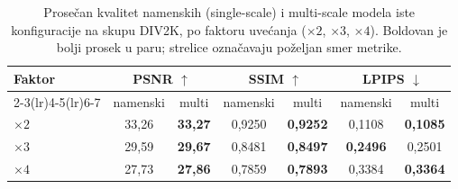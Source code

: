 \begin{table}[H]
    \centering
    \caption{Prosečan kvalitet namenskih (single-scale) i multi-scale modela iste konfiguracije na skupu DIV2K, po faktoru uvećanja ($\times2$, $\times3$, $\times4$). Boldovan je bolji prosek u paru; strelice označavaju poželjan smer metrike.}
    \label{tab:multiscale_DIV2K}
    \begingroup
    \small
    \setlength{\tabcolsep}{5pt}
    \renewcommand{\arraystretch}{1.15}
    \begin{tabular}{@{}lcccccc@{}}
        \toprule
        Faktor & \multicolumn{2}{c}{PSNR $\uparrow$} & \multicolumn{2}{c}{SSIM $\uparrow$} & \multicolumn{2}{c}{LPIPS $\downarrow$} \\
        \cmidrule(lr){2-3}\cmidrule(lr){4-5}\cmidrule(lr){6-7}
         & namenski & multi & namenski & multi & namenski & multi \\
        \midrule
        $\times2$ & 33,26 & \textbf{33,27} & 0,9250 & \textbf{0,9252} & 0,1108 & \textbf{0,1085} \\
        $\times3$ & 29,59 & \textbf{29,67} & 0,8481 & \textbf{0,8497} & \textbf{0,2496} & 0,2501 \\
        $\times4$ & 27,73 & \textbf{27,86} & 0,7859 & \textbf{0,7893} & 0,3384 & \textbf{0,3364} \\
        \bottomrule
    \end{tabular}
    \endgroup
\end{table}